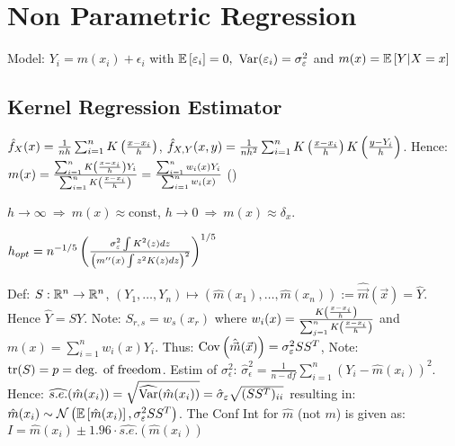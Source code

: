 \section{Non Parametric Regression}

\vspace{-5pt}

Model: $Y_i = m(x_i) + \epsilon_i$ with $\Expec\eckigeklammer{\epsilon_i} = 0, \ \Var(\epsilon_i) = \sigma_{\epsilon}^2$ and $m(x) = \mathbb{E}\left[ Y|X=x \right]$

\vspace{-5pt}

\subsection{Kernel Regression Estimator}
$\hat{f}_X (x) = \frac{1}{nh} \sum_{i=1}^n K \left( \frac{x-x_i}{h} \right)$, $\hat{f}_{X,Y} (x,y) = \frac{1}{nh^2} \sum_{i=1}^n K \left( \frac{x-x_i}{h} \right) K \left( \frac{y-Y_i}{h} \right)$. Hence: $m(x) = \frac{\sum_{i=1}^n K \left( \frac{x-x_i}{h} \right)Y_i}{\sum_{i=1}^n K \left( \frac{x-x_i}{h} \right)} = \frac{\sum_{i=1}^n w_i (x) Y_i}{\sum_{i=1}^n w_i (x)}$ ()

\vspace{5pt}

 $h\rightarrow \infty \ \Rightarrow \ m(x) \approx \text{const}$, $h \rightarrow 0 \ \Rightarrow \ m(x) \approx \delta_x$.

$h_{opt} = n^{-1/5} \left( \frac{\sigma_\varepsilon^2 \int K^2 (z) dz}{\left( m'' (x) \int z^2 K(z) dz \right)^2} \right)^{1/
5}$

\vspace{4pt}

Def: $S: \mathbb{R}^n \rightarrow \mathbb{R}^n$, $(Y_1,\dots,Y_n) \mapsto (\hat{m}(x_1),\dots,\hat{m}(x_n)) := \hat{\vec{m}} (\vec{x}) = \hat{Y}$. Hence $\hat{Y} = S Y$. Note: $S_{r,s} = w_s (x_r)$ where $w_i (x) = \frac{K \left( \frac{x-x_i}{h} \right)}{\sum_{j=1}^n K \left( \frac{x-x_i}{h} \right)}$ and $m(x)=\sum_{i=1}^n w_i (x) Y_i$. Thus: $\text{Cov}\left( \hat{\vec{m}}(\vec{x}) \right) = \sigma_\varepsilon^2 S S^T$, Note: $\text{tr}(S) = p = \text{deg. of freedom}$. Estim of $\sigma_\epsilon^2$: $\hat{\sigma}_{\epsilon}^2 = \frac{1}{n-df} \sum_{i=1}^n (Y_i - \hat{m}(x_i))^2$. Hence: $\widehat{s.e.} (\hat{m}(x_i)) = \sqrt{\widehat{\text{Var}}(\hat{m}(x_i))} = \hat{\sigma}_\varepsilon \sqrt{(SS^T)_{ii}}$ resulting in: $\hat{m}(x_i) \sim \mathcal{N} \left( \mathbb{E}\left[ \hat{m}(x_i) \right],\sigma_\varepsilon^2 SS^T \right)$. The Conf Int for $\hat{m}$ (not $m$) is given as: $I = \hat{m}(x_i) \pm 1.96 \cdot \widehat{s.e.}(\hat{m}(x_i))$

